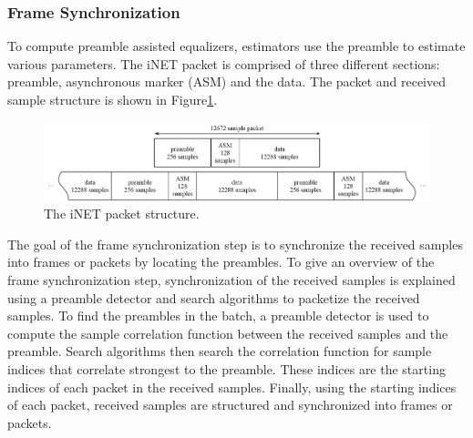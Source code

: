 \subsubsection{Frame Synchronization}
To compute preamble assisted equalizers, estimators use the preamble to estimate various parameters. 
The iNET packet is comprised of three different sections: preamble, asynchronous marker (ASM) and the data. 
The packet and received sample structure is shown in Figure\ref{fig:packet}.
\begin{figure}
	\centering\includegraphics[width=\textwidth]{figures/gpu/packet.png}
	\caption{The iNET packet structure.}
	\label{fig:packet}
\end{figure}

The goal of the frame synchronization step is to synchronize the received samples into frames or packets by locating the preambles. 
To give an overview of the frame synchronization step, synchronization of the received samples is explained using a preamble detector and search algorithms to packetize the received samples. 
To find the preambles in the batch, a preamble detector is used to compute the sample correlation function between the received samples and the preamble. 
Search algorithms then search the correlation function for sample indices that correlate strongest to the preamble. These indices are the starting indices of each packet in the received samples. 
Finally, using the starting indices of each packet, received samples are structured and synchronized into frames or packets.


